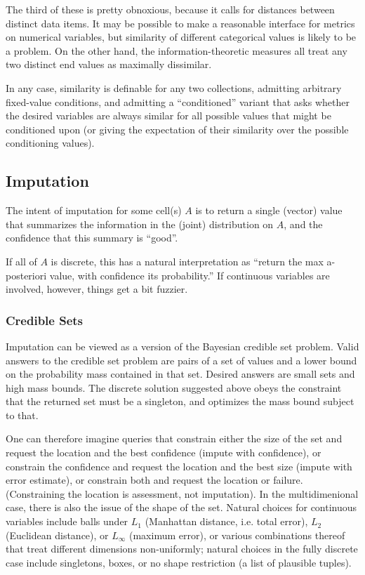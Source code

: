 \documentclass[10pt,letterpaper]{article}
\begin{document}
The third of these is pretty obnoxious, because it calls for distances
between distinct data items.  It may be possible to make a reasonable
interface for metrics on numerical variables, but similarity of
different categorical values is likely to be a problem.  On the other
hand, the information-theoretic measures all treat any two distinct
end values as maximally dissimilar.

In any case, similarity is definable for any two collections,
admitting arbitrary fixed-value conditions, and admitting a
``conditioned'' variant that asks whether the desired variables are
always similar for all possible values that might be conditioned upon
(or giving the expectation of their similarity over the possible
conditioning values).

\subsection{Imputation}

The intent of imputation for some cell(s) $A$ is to return a single
(vector) value that summarizes the information in the (joint)
distribution on $A$, and the confidence that this summary is ``good''.

If all of $A$ is discrete, this has a natural interpretation as
``return the max a-posteriori value, with confidence its
probability.''  If continuous variables are involved, however, things
get a bit fuzzier.

\subsubsection{Credible Sets}

Imputation can be viewed as a version of the Bayesian credible set
problem.  Valid answers to the credible set problem are pairs of a set
of values and a lower bound on the probability mass contained in that
set.  Desired answers are small sets and high mass bounds.  The
discrete solution suggested above obeys the constraint that the
returned set must be a singleton, and optimizes the mass bound subject
to that.

One can therefore imagine queries that constrain either the size of
the set and request the location and the best confidence (impute with
confidence), or constrain the confidence and request the location and
the best size (impute with error estimate), or constrain both and
request the location or failure.  (Constraining the location is
assessment, not imputation).  In the multidimenional case, there is
also the issue of the shape of the set.  Natural choices for
continuous variables include balls under $L_1$ (Manhattan distance,
i.e. total error), $L_2$ (Euclidean distance), or $L_\infty$ (maximum
error), or various combinations thereof that treat different
dimensions non-uniformly; natural choices in the fully discrete case
include singletons, boxes, or no shape restriction (a list of
plausible tuples).
\end{document}
